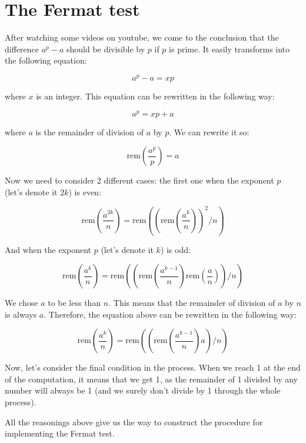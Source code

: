 \section*{The Fermat test}

After watching some videos on youtube, we come to the conclusion that the difference $a^p - a$ should be divisible by $p$ if $p$ is prime. It easily transforms into the following equation:

\[
a^p - a = xp
\]

where $x$ is an integer. This equation can be rewritten in the following way:

\[
a^p = xp + a
\]

where $a$ is the remainder of division of $a$ by $p$. We can rewrite it so:

\[
\text{rem}\left(\frac{a^p}{p} \right) = a
\]

Now we need to consider 2 different cases: the first one when the exponent $p$ (let's denote it $2k$) is even:

\[
\text{rem} \left(\frac{a^{2k}}{n}\right) = \text{rem}\left(\left(\text{rem}\left(\frac{a^k}{n}\right)\right)^2 /n \right)
\]

And when the exponent $p$ (let's denote it $k$) is odd:

\[
\text{rem}\left(\frac{a^k}{n}\right) = \text{rem}\left(\left(\text{rem}\left(\frac{a^{k-1}}{n}\right) \text{rem}\left(\frac{a}{n}\right)\right) / n \right)
\]

We chose $a$ to be less than $n$. This means that the remainder of division of $a$ by $n$ is always $a$. Therefore, the equation above can be rewritten in the following way:

\[
\text{rem}\left(\frac{a^k}{n}\right) = \text{rem}\left(\left(\text{rem}\left(\frac{a^{k-1}}{n}\right) a \right) / n \right)
\]

Now, let's consider the final condition in the process. When we reach 1 at the end of the computation, it means that we get 1, as the remainder of 1 divided by any number will always be 1 (and we surely don't divide by 1 through the whole process).

All the reasonings above give us the way to construct the procedure for implementing the Fermat test.
